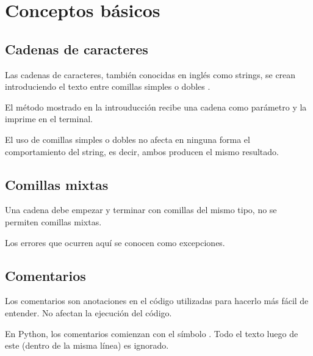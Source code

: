 \chapter{Conceptos básicos}

\section{Cadenas de caracteres}

Las cadenas de caracteres, también conocidas en inglés como strings, se crean introduciendo el texto entre comillas simples \ttt{\q \q} o dobles \ttt{\qq \qq}.


El método  mostrado en la introuducción recibe una cadena como parámetro y la imprime en el terminal.


El uso de comillas simples o dobles no afecta en ninguna forma el comportamiento del string, es decir, ambos producen el mismo resultado.

\section{Comillas mixtas}

Una cadena debe empezar y terminar con comillas del mismo tipo, no se permiten comillas mixtas.


Los errores que ocurren aquí se conocen como excepciones.

\section{Comentarios}

Los comentarios son anotaciones en el código utilizadas para hacerlo más fácil de entender.
No afectan la ejecución del código.

En Python, los comentarios comienzan con el símbolo \ttt{\#}.
Todo el texto luego de este \ttt{\#} (dentro de la misma línea) es ignorado.


